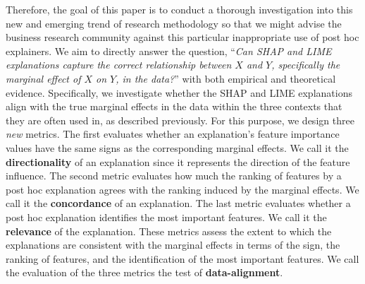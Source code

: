 \documentclass[12pt]{article}  %
\begin{document}
Therefore, the goal of this paper is to conduct a thorough investigation into this new and emerging trend of research methodology so that we might advise the business research community
against this particular inappropriate use of post hoc explainers. We aim to directly answer the question, %
``\emph{Can SHAP and LIME explanations capture the correct relationship between $X$ and $Y$, specifically the marginal effect of $X$ on $Y$, in the data?}''
with both empirical and theoretical evidence.  Specifically, we investigate whether the SHAP and LIME explanations align with the true marginal effects in the data within the three contexts that they are often used in, as described previously. For this purpose, we design three \textit{new} metrics. The first evaluates whether an explanation's feature importance values have the same signs as the corresponding marginal effects. We call it the \textbf{directionality} of an explanation since it represents the direction of the feature influence. The second metric evaluates how much the ranking of features by a post hoc explanation agrees with the ranking induced by the marginal effects. We call it the \textbf{concordance} of an explanation. The last metric evaluates whether a post hoc explanation identifies the most important features. We call it the \textbf{relevance} of the explanation. These metrics assess the extent to which the explanations are consistent with the marginal effects in terms of the sign, the ranking of features, and the identification of the most important features. We call the evaluation of the three metrics the test of \textbf{data-alignment}.
\end{document}
